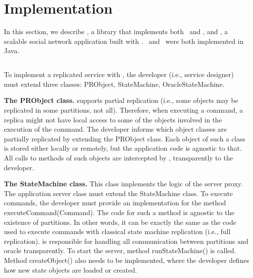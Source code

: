 \section{Implementation}
\label{sec:dssmr-implementation}

In this section, we describe \dssmrlibname{}, a library that implements both
\ssmr\ and \dssmr{}, and \dssmrappname{}, a scalable social network application
built with \dssmrlibname{}. \dssmrlibname\ and \dssmrappname\ were both
implemented in Java. 

\subsection{\dssmrlibname}

To implement a replicated service with \dssmrlibname{}, the developer (i.e., service
designer) must extend three classes: PRObject, StateMachine, OracleStateMachine.

\textbf{The PRObject class.} \dssmrlibname{} supports partial replication (i.e., some
objects may be replicated in some partitions, not all). Therefore, when
executing a command, a replica might not have local access to some of the
objects involved in the execution of the command. The developer informs
\dssmrlibname{} which object classes are partially replicated by extending the
PRObject class. Each object of such a class is stored either locally or remotely,
but the application code is agnostic to that. All calls to methods of such
objects are intercepted by \dssmrlibname{}, transparently to the developer.


\textbf{The StateMachine class.} This class implements the logic of the server
proxy. The application server class must extend the StateMachine class. To
execute commands, the developer must provide an implementation for the method
executeCommand(Command). The code for such a method is agnostic to the existence
of partitions. In other words, it can be exactly the same as the code used to
execute commands with classical state machine replication (i.e., full
replication). \dssmrlibname{} is responsible for handling all communication between
partitions and oracle transparently. To start the server, method
runStateMachine() is called. Method createObject() also needs to be implemented,
where the developer defines how new state objects are loaded or created.

